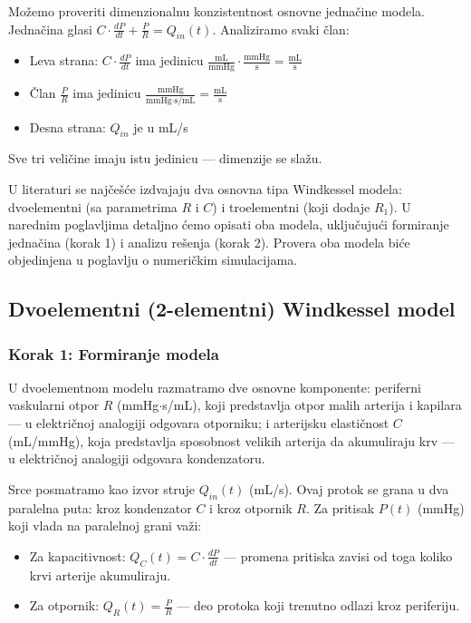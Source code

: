 \documentclass[12pt,a4paper]{article}
\begin{document}
Možemo proveriti dimenzionalnu konzistentnost osnovne jednačine modela. Jednačina glasi $C\cdot\frac{dP}{dt} + \frac{P}{R} = Q_{in}(t)$. Analiziramo svaki član:
\begin{itemize}
    \item Leva strana: $C\cdot\frac{dP}{dt}$ ima jedinicu $\frac{\text{mL}}{\text{mmHg}}\cdot\frac{\text{mmHg}}{\text{s}} = \frac{\text{mL}}{\text{s}}$
    \item Član $\frac{P}{R}$ ima jedinicu $\frac{\text{mmHg}}{\text{mmHg}\cdot\text{s/mL}} = \frac{\text{mL}}{\text{s}}$
    \item Desna strana: $Q_{in}$ je u mL/s
\end{itemize}
Sve tri veličine imaju istu jedinicu --- dimenzije se slažu.

U literaturi se najčešće izdvajaju dva osnovna tipa Windkessel modela: dvoelementni (sa parametrima $R$ i $C$) i troelementni (koji dodaje $R_1$). U narednim poglavljima detaljno ćemo opisati oba modela, uključujući formiranje jednačina (korak 1) i analizu rešenja (korak 2). Provera oba modela biće objedinjena u poglavlju o numeričkim simulacijama.

\subsection{Dvoelementni (2-elementni) Windkessel model}

\subsubsection{Korak 1: Formiranje modela}

U dvoelementnom modelu razmatramo dve osnovne komponente: periferni vaskularni otpor $R$ (mmHg$\cdot$s/mL), koji predstavlja otpor malih arterija i kapilara --- u električnoj analogiji odgovara otporniku; i arterijsku elastičnost $C$ (mL/mmHg), koja predstavlja sposobnost velikih arterija da akumuliraju krv --- u električnoj analogiji odgovara kondenzatoru.

Srce posmatramo kao izvor struje $Q_{in}(t)$ (mL/s). Ovaj protok se grana u dva paralelna puta: kroz kondenzator $C$ i kroz otpornik $R$. Za pritisak $P(t)$ (mmHg) koji vlada na paralelnoj grani važi:
\begin{itemize}
    \item Za kapacitivnost: $Q_C(t) = C\cdot\frac{dP}{dt}$ --- promena pritiska zavisi od toga koliko krvi arterije akumuliraju.
    \item Za otpornik: $Q_R(t) = \frac{P}{R}$ --- deo protoka koji trenutno odlazi kroz periferiju.
\end{itemize}
\end{document}
